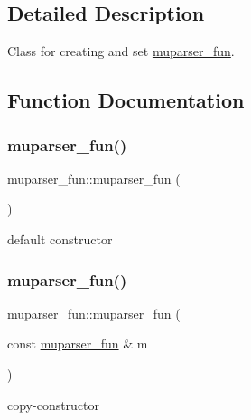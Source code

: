 \subsection{Detailed Description}
Class for creating and set \hyperlink{classmuparser__fun}{muparser\+\_\+fun}. 



\subsection{Function Documentation}
\mbox{\label{group__MuParser_ga17c98796657ea4da75ca6e273f0b6965}} 
\subsubsection{\texorpdfstring{muparser\+\_\+fun()}{muparser\_fun()}\hspace{0.1cm}{\footnotesize\ttfamily [1/2]}}
{\footnotesize\ttfamily muparser\+\_\+fun\+::muparser\+\_\+fun (\begin{DoxyParamCaption}{ }\end{DoxyParamCaption})\hspace{0.3cm}{\ttfamily [default]}}

default constructor \mbox{\label{group__MuParser_ga106b21c0b17eb9fbc347fd510f617efb}} 
\subsubsection{\texorpdfstring{muparser\+\_\+fun()}{muparser\_fun()}\hspace{0.1cm}{\footnotesize\ttfamily [2/2]}}
{\footnotesize\ttfamily muparser\+\_\+fun\+::muparser\+\_\+fun (\begin{DoxyParamCaption}\item[{const \hyperlink{classmuparser__fun}{muparser\+\_\+fun} \&}]{m }\end{DoxyParamCaption})}

copy-\/constructor \mbox{\label{group__MuParser_gad6ad244f299a60774735832c4ea28d66}} 
